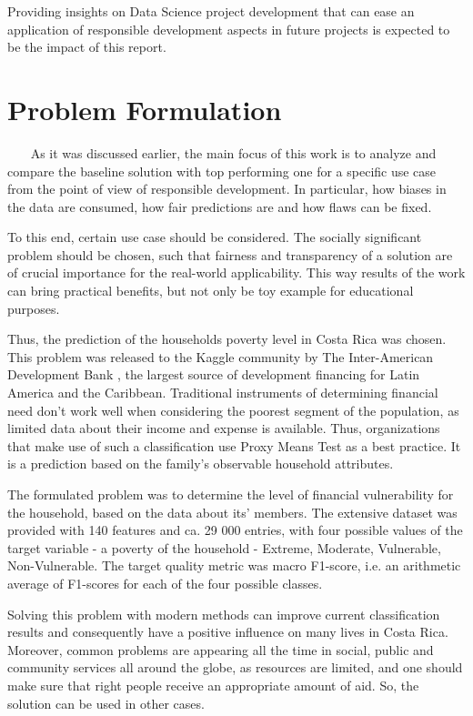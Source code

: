     Providing insights on Data Science project development that can ease an application of responsible development aspects in future projects is expected to be the impact of this report.

\section{Problem Formulation}~~~
    As it was discussed earlier, the main focus of this work is to analyze and compare the baseline solution with top performing one for a specific use case from the point of view of responsible development. In particular, how biases in the data are consumed, how fair predictions are and how flaws can be fixed.

    To this end, certain use case should be considered. The socially significant problem should be chosen, such that fairness and transparency of a solution are of crucial importance for the real-world applicability. This way results of the work can bring practical benefits, but not only be toy example for educational purposes.

    Thus, the prediction of the households poverty level in Costa Rica was chosen. This problem was released to the Kaggle community by The Inter-American Development Bank \cite{kaggle}, the largest source of development financing for Latin America and the Caribbean. Traditional instruments of determining financial need don’t work well when considering the poorest segment of the population, as limited data about their income and expense is available. Thus, organizations that make use of such a classification use Proxy Means Test as a best practice. It is a prediction based on the family’s observable household attributes. 
    
    The formulated problem was to determine the level of financial vulnerability for the household, based on the data about its’ members. The extensive dataset was provided with 140 features and ca. 29 000 entries, with four possible values of the target variable - a poverty of the household -  Extreme, Moderate, Vulnerable, Non-Vulnerable. The target quality metric was macro F1-score, i.e. an arithmetic average of F1-scores for each of the four possible classes. 
    
    Solving this problem with modern methods can improve current classification results and consequently have a positive influence on many lives in Costa Rica. Moreover, common problems are appearing all the time in social, public and community services all around the globe, as resources are limited, and one should make sure that right people receive an appropriate amount of aid. So, the solution can be used in other cases.
    
